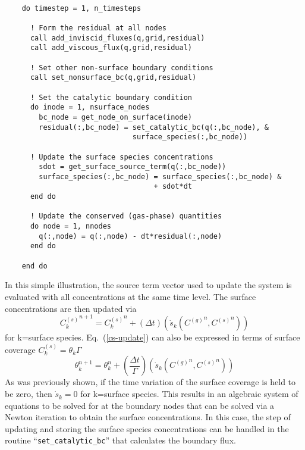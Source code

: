 \documentclass{report}
\newcommand{\eref}[1]{Eq.~(\ref{#1})}
\newcommand{\sk}{\dot{s}_k}
\newcommand{\cg}[1]{{C_{#1}^{(g)}}}
\newcommand{\cs}[1]{{C_{#1}^{(s)}}}
\begin{document}
\begin{enumerate}[label=(\alph*)]
    \begin{lstlisting}[language=FORTRAN, caption=Simple Implementation]

    do timestep = 1, n_timesteps

      ! Form the residual at all nodes
      call add_inviscid_fluxes(q,grid,residual)
      call add_viscous_flux(q,grid,residual)

      ! Set other non-surface boundary conditions
      call set_nonsurface_bc(q,grid,residual)

      ! Set the catalytic boundary condition
      do inode = 1, nsurface_nodes
        bc_node = get_node_on_surface(inode)
        residual(:,bc_node) = set_catalytic_bc(q(:,bc_node), &
                              surface_species(:,bc_node))

      ! Update the surface species concentrations
        sdot = get_surface_source_term(q(:,bc_node))
        surface_species(:,bc_node) = surface_species(:,bc_node) &
                                   + sdot*dt
      end do

      ! Update the conserved (gas-phase) quantities
      do node = 1, nnodes
        q(:,node) = q(:,node) - dt*residual(:,node)
      end do

    end do

    \end{lstlisting}
    In this simple illustration, the source term vector used to update the
    system is evaluated with all concentrations at the same time level.  The
    surface concentrations are then updated via
    \begin{equation}
      \cs{k}^{n+1} = \cs{k}^{n} + \left(\Delta
      t\right)\left(\sk(\cg{}^{n},\cs{}^{n})\right)
      \label{cs-update}
    \end{equation}
    for k=surface species.  \eref{cs-update} can also be expressed in terms of
    surface coverage $\cs{k} = \theta_k \Gamma$
    \begin{equation}
      \theta_{k}^{n+1} = \theta_{k}^{n} + \left(\frac{\Delta t}{\Gamma}
      \right)\left(\sk(\cg{}^{n},\cs{}^{n})\right)
      \label{theta-update}
    \end{equation}
    As was previously shown, if the time variation of the surface coverage is
    held to be zero, then $\sk = 0$ for k=surface species.  This results in an
    algebraic system of equations to be solved for at the boundary nodes that
    can be solved via a Newton iteration to obtain the surface concentrations.
    In this case, the step of updating and storing the surface species
    concentrations can be handled in the routine ``\verb|set_catalytic_bc|''
    that calculates the boundary flux.  
    

\end{enumerate}
\end{document}
